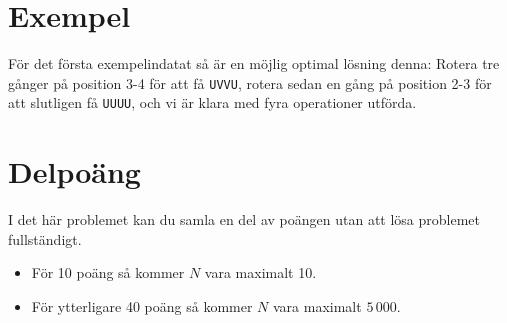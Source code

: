 \section*{Exempel}
För det första exempelindatat så är en möjlig optimal lösning denna: Rotera
tre gånger på position 3-4 för att få \texttt{UVVU}, rotera sedan en gång på
position 2-3 för att slutligen få \texttt{UUUU}, och vi är klara med fyra
operationer utförda.

\section*{Delpoäng} I det här problemet kan du samla en del av poängen utan att
lösa problemet fullständigt.

\begin{itemize}
    \item För 10 poäng så kommer $N$ vara maximalt 10.
    \item För ytterligare 40 poäng så kommer $N$ vara maximalt $5\,000$.
\end{itemize}
